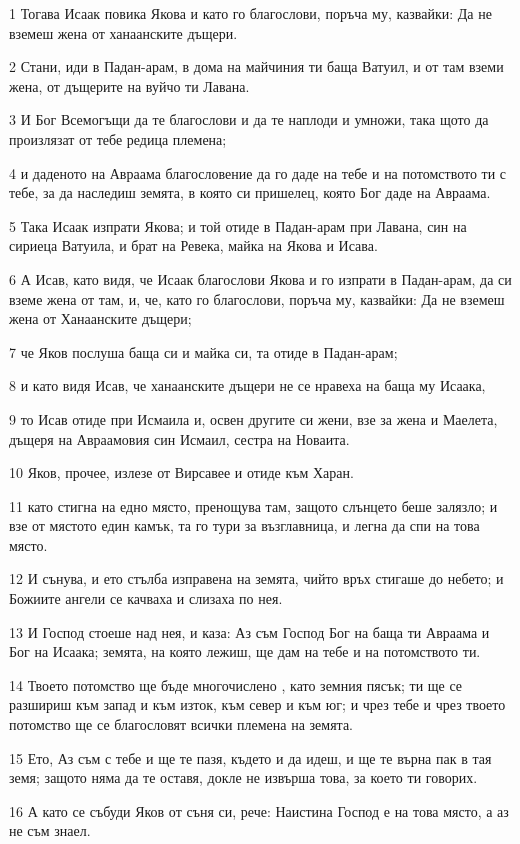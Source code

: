 \par 1 Тогава Исаак повика Якова и като го благослови, поръча му, казвайки: Да не вземеш жена от ханаанските дъщери.
\par 2 Стани, иди в Падан-арам, в дома на майчиния ти баща Ватуил, и от там вземи жена, от дъщерите на вуйчо ти Лавана.
\par 3 И Бог Всемогъщи да те благослови и да те наплоди и умножи, така щото да произлязат от тебе редица племена;
\par 4 и даденото на Авраама благословение да го даде на тебе и на потомството ти с тебе, за да наследиш земята, в която си пришелец, която Бог даде на Авраама.
\par 5 Така Исаак изпрати Якова; и той отиде в Падан-арам при Лавана, син на сириеца Ватуила, и брат на Ревека, майка на Якова и Исава.
\par 6 А Исав, като видя, че Исаак благослови Якова и го изпрати в Падан-арам, да си вземе жена от там, и, че, като го благослови, поръча му, казвайки: Да не вземеш жена от Ханаанските дъщери;
\par 7 че Яков послуша баща си и майка си, та отиде в Падан-арам;
\par 8 и като видя Исав, че ханаанските дъщери не се нравеха на баща му Исаака,
\par 9 то Исав отиде при Исмаила и, освен другите си жени, взе за жена и Маелета, дъщеря на Авраамовия син Исмаил, сестра на Новаита.
\par 10 Яков, прочее, излезе от Вирсавее и отиде към Харан.
\par 11 като стигна на едно място, пренощува там, защото слънцето беше залязло; и взе от мястото един камък, та го тури за възглавница, и легна да спи на това място.
\par 12 И сънува, и ето стълба изправена на земята, чийто връх стигаше до небето; и Божиите ангели се качваха и слизаха по нея.
\par 13 И Господ стоеше над нея, и каза: Аз съм Господ Бог на баща ти Авраама и Бог на Исаака; земята, на която лежиш, ще дам на тебе и на потомството ти.
\par 14 Твоето потомство ще бъде многочислено , като земния пясък; ти ще се разшириш към запад и към изток, към север и към юг; и чрез тебе и чрез твоето потомство ще се благословят всички племена на земята.
\par 15 Ето, Аз съм с тебе и ще те пазя, където и да идеш, и ще те върна пак в тая земя; защото няма да те оставя, докле не извърша това, за което ти говорих.
\par 16 А като се събуди Яков от съня си, рече: Наистина Господ е на това място, а аз не съм знаел.
